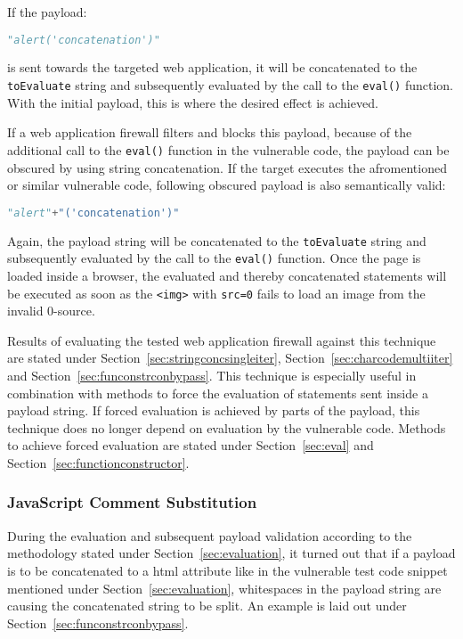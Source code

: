 If the payload:

\begin{lstlisting}[style=basicStyle, language=Python]
"alert('concatenation')"
\end{lstlisting}
is sent towards the targeted web application, it will be concatenated to the \verb|toEvaluate| string and subsequently evaluated by the call to the \verb|eval()| function. With the initial payload, this is where the desired effect is achieved.

If a web application firewall filters and blocks this payload, because of the additional call to the \verb|eval()| function in the vulnerable code, the payload can be obscured by using string concatenation. If the target executes the afromentioned or similar vulnerable code, following obscured payload is also semantically valid:

\begin{lstlisting}[style=basicStyle, language=Python]
"alert"+"('concatenation')"
\end{lstlisting}
Again, the payload string will be concatenated to the \verb|toEvaluate| string and subsequently evaluated by the call to the \verb|eval()| function. Once the page is loaded inside a browser, the evaluated and thereby concatenated statements will be executed as soon as the \verb|<img>| with \verb|src=0| fails to load an image from the invalid 0-source.

Results of evaluating the tested web application firewall against this technique are stated under Section~\ref{sec:stringconcsingleiter}, Section~\ref{sec:charcodemultiiter} and Section~\ref{sec:funconstrconbypass}. This technique is especially useful in combination with methods to force the evaluation of statements sent inside a payload string. If forced evaluation is achieved by parts of the payload, this technique does no longer depend on evaluation by the vulnerable code. Methods to achieve forced evaluation are stated under Section~\ref{sec:eval} and Section~\ref{sec:functionconstructor}.


\subsubsection{JavaScript Comment Substitution}
\label{sec:jscommentsub}
During the evaluation and subsequent payload validation according to the methodology stated under Section~\ref{sec:evaluation}, it turned out that if a payload is to be concatenated to a \acrshort{html} attribute like in the vulnerable test code snippet mentioned under Section~\ref{sec:evaluation}, whitespaces in the payload string are causing the concatenated string to be split. An example is laid out under Section~\ref{sec:funconstrconbypass}.

